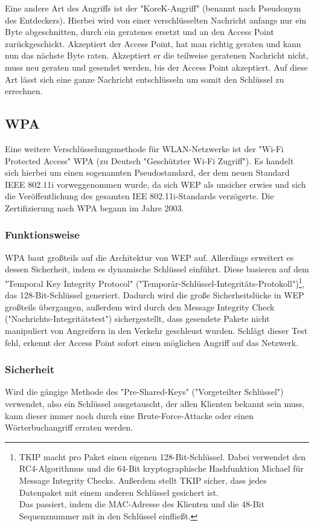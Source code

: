 \documentclass[a4paper,13pt]{scrartcl}
\begin{document}
Eine andere Art des Angriffs ist der "KoreK-Angriff" (benannt nach Pseudonym des Entdeckers). Hierbei wird von einer verschlüsselten Nachricht anfangs nur ein Byte abgeschnitten, durch ein geratenes ersetzt und an den Access Point zurückgeschickt. Akzeptiert der Access Point, hat man richtig geraten und kann nun das nächste Byte raten. Akzeptiert er die teilweise geratenen Nachricht nicht, muss neu geraten und gesendet werden, bis der Access Point akzeptiert. Auf diese Art lässt sich eine ganze Nachricht entschlüsseln um somit den Schlüssel zu errechnen.
\subsection{WPA}
Eine weitere Verschlüsselungsmethode für WLAN-Netzwerke ist der "Wi-Fi Protected Access" WPA (zu Deutsch "Geschützter Wi-Fi Zugriff"). Es handelt sich hierbei um einen sogenannten Pseudostandard, der dem neuen Standard IEEE 802.11i vorweggenommen wurde, da sich WEP als unsicher erwies und sich die Veröffentlichung des gesamten IEE 802.11i-Standards verzögerte. Die Zertifizierung nach WPA begann im Jahre 2003.
\subsubsection{Funktionsweise}
WPA baut großteils auf die Architektur von WEP auf. Allerdings erweitert es dessen Sicherheit, indem es dynamische Schlüssel einführt. Diese basieren auf dem "Temporal Key Integrity Protocol" ("Temporär-Schlüssel-Integritäts-Protokoll")\footnote{TKIP macht pro Paket einen eigenen 128-Bit-Schlüssel. Dabei verwendet den RC4-Algorithmus und die 64-Bit kryptographische Hashfunktion Michael für Message Integrity Checks. Außerdem stellt TKIP sicher, dass jedes Datenpaket mit einem anderen Schlüssel gesichert ist.\\
Das passiert, indem die MAC-Adresse des Klienten und die 48-Bit Sequenznummer mit in den Schlüssel einfließt.}, das 128-Bit-Schlüssel generiert. Dadurch wird die große Sicherheitslücke in WEP großteils übergangen, außerdem wird durch den Message Integrity Check ("Nachrichts-Integritätstest") sichergestellt, dass gesendete Pakete nicht manipuliert von Angreifern in den Verkehr geschleust wurden. Schlägt dieser Test fehl, erkennt der Access Point sofort einen möglichen Angriff auf das Netzwerk.
\subsubsection{Sicherheit}
Wird die gängige Methode des "Pre-Shared-Keys" ("Vorgeteilter Schlüssel") verwendet, also ein Schlüssel ausgetauscht, der allen Klienten bekannt sein muss, kann dieser immer noch durch eine Brute-Force-Attacke oder einen Wörterbuchangriff erraten werden.
\end{document}
